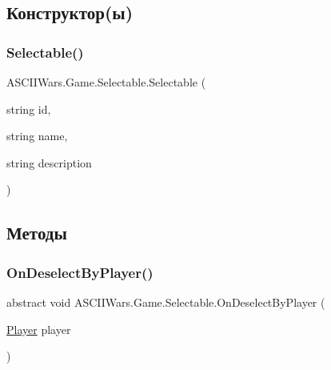 \subsection{Конструктор(ы)}
\hypertarget{class_a_s_c_i_i_wars_1_1_game_1_1_selectable_aa473dd0350842e4adfefa8e71accadd2}{}\label{class_a_s_c_i_i_wars_1_1_game_1_1_selectable_aa473dd0350842e4adfefa8e71accadd2} 
\subsubsection{\texorpdfstring{Selectable()}{Selectable()}}
{\footnotesize\ttfamily A\+S\+C\+I\+I\+Wars.\+Game.\+Selectable.\+Selectable (\begin{DoxyParamCaption}\item[{string}]{id,  }\item[{string}]{name,  }\item[{string}]{description }\end{DoxyParamCaption})\hspace{0.3cm}{\ttfamily [inline]}}



\subsection{Методы}
\hypertarget{class_a_s_c_i_i_wars_1_1_game_1_1_selectable_a08a30c8786367bf45355e989b109c44b}{}\label{class_a_s_c_i_i_wars_1_1_game_1_1_selectable_a08a30c8786367bf45355e989b109c44b} 
\subsubsection{\texorpdfstring{On\+Deselect\+By\+Player()}{OnDeselectByPlayer()}}
{\footnotesize\ttfamily abstract void A\+S\+C\+I\+I\+Wars.\+Game.\+Selectable.\+On\+Deselect\+By\+Player (\begin{DoxyParamCaption}\item[{\hyperlink{class_a_s_c_i_i_wars_1_1_game_1_1_player}{Player}}]{player }\end{DoxyParamCaption})\hspace{0.3cm}{\ttfamily [pure virtual]}}



